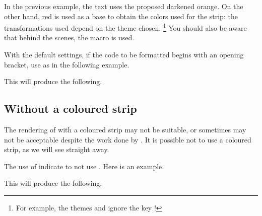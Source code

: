 \begin{tdocnote}
    In the previous example, the text uses the proposed darkened orange. On the other hand, red is used as a base to obtain the colors used for the strip: the transformations used depend on the theme chosen.%
    \footnote{
        For example, the themes  and  ignore the key !
    }
    You should also be aware that behind the scenes, the macro  is used.

    \begin{tdoclatex}[std]
    \end{tdoclatex}
\end{tdocnote}




\begin{tdocwarn}
    With the default settings, if the code to be formatted begins with an opening bracket, use  as in the following example.



    This will produce the following.
\end{tdocwarn}






\subsection{Without a coloured strip}

The rendering of  with a coloured strip may not be suitable, or sometimes may not be acceptable despite the work done by .
It is possible not to use a coloured strip, as we will see straight away.


\begin{tdocexa}
    The use of  indicate to not use .
    Here is an example.



    This will produce the following.

    \medskip

    

\end{tdocexa}


